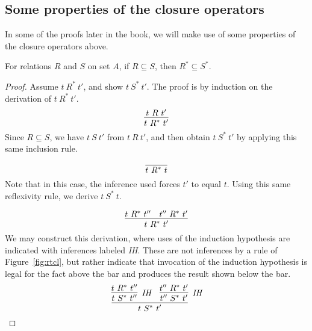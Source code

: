 \subsection{Some properties of the closure operators}

In some of the proofs later in the book, we will make use of some properties
of the closure operators above.

\begin{lemma}
\label{lem:starmono}
  For relations $R$ and $S$ on set $A$, if $R \subseteq S$, then $R^* \subseteq S^*$.
\end{lemma}
\begin{proof}
  Assume $t\ R^*\ t'$, and show $t\ S^*\ t'$.  The proof is by induction
  on the derivation of $t\ R^*\ t'$.
  \case{ }
  \[
  \infer{t\ R^*\ t'}{t\ R\ t'}
  \]
  \noindent Since $R \subseteq S$, we have $t\ S\ t'$ from $t\ R\ t'$, and
  then obtain $t\ S^*\ t'$ by applying this same inclusion rule.

  \case{ }
  \[
  \infer{t\ R^*\ t}{\ }
  \]
  \noindent Note that in this case, the inference used forces $t'$ to equal $t$.
  Using this same reflexivity rule, we derive $t\ S^*\ t$.

  \case{ }
  \[
  \infer{t\ R^*\ t'}{t\ R^*\ t'' & t''\ R^*\ t'}
  \]
  \noindent We may construct this derivation, where uses of the
  induction hypothesis are indicated with inferences labeled
  \textit{IH}.  These are not inferences by a rule of
  Figure~\ref{fig:rtcl}, but rather indicate that invocation of the
  induction hypothesis is legal for the fact above the bar and
  produces the result shown below the bar.
  \[
  \infer{t\ S^*\ t'}{\infer[\textit{IH}]{t\ S^*\ t''}{t\ R^*\ t''} & \infer[\textit{IH}]{t''\ S^*\ t'}{t''\ R^*\ t'}}
  \]
\end{proof}

